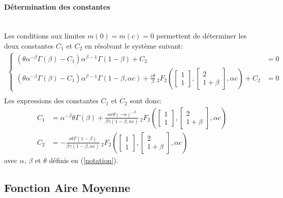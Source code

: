 \paragraph{Détermination des constantes}\phantom{}\\
Les conditions aux limites $m(0)=m(c)=0$ permettent de déterminer les deux constantes $C_1$ et $C_2$ en résolvant le système suivant: 
\begin{align*}
\left\{\begin{aligned}
(\theta\alpha^{-\beta}\Gamma(\beta)-C_1)\alpha^{\beta-1}\Gamma(1-\beta) + C_2 &= 0\\
(\theta\alpha^{-\beta}\Gamma(\beta)-C_1)\alpha^{\beta-1}\Gamma(1-\beta,\alpha c) + \frac{c\theta}{\beta}\,{}_2F_2\left(\begin{bmatrix}1\\1\end{bmatrix},\begin{bmatrix}2\\1+\beta\end{bmatrix},\alpha c\right)+ C_2 &= 0
\end{aligned}\right. \\
\end{align*}
Les expressions des constantes $C_1$ et $C_2$ sont donc:
\begin{equation}\label{mean_constants}
    \begin{aligned}
        C_1 &= \alpha^{-\beta}\theta\Gamma(\beta)+\frac{\alpha c \theta {(-\alpha)}^{-\beta}}{\beta\gamma(1-\beta,\alpha c)}\,{}_2F_2\left(\begin{bmatrix}1\\1\end{bmatrix},\begin{bmatrix}2\\1+\beta\end{bmatrix},\alpha c\right) \\
        C_2 &= -\frac{c\theta\Gamma(1-\beta)}{\beta\gamma(1-\beta,\alpha c)}\,{}_2F_2\left(\begin{bmatrix}1\\1\end{bmatrix},\begin{bmatrix}2\\1+\beta\end{bmatrix},\alpha c\right)
    \end{aligned}
\end{equation}
avec $\alpha$, $\beta$ et $\theta$ définis en (\ref{notation}).

\subsection{Fonction Aire Moyenne}

